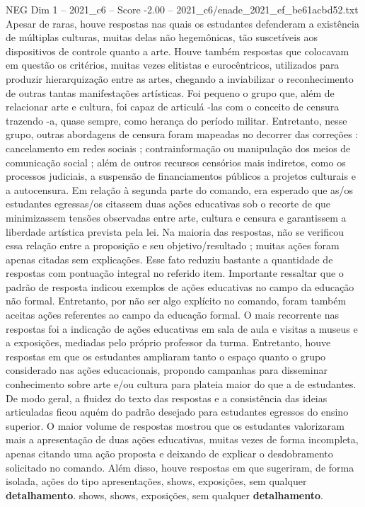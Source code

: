 \begin{textsample}{NEG Dim 1 – 2021\_c6 – Score -2.00 – 2021\_c6/enade\_2021\_ef\_be61acbd52.txt}
Apesar de raras, houve respostas nas quais os estudantes defenderam a existência de múltiplas culturas, muitas delas não hegemônicas, tão suscetíveis aos dispositivos de controle quanto a arte.
Houve também respostas que colocavam em questão os critérios, muitas vezes elitistas e eurocêntricos, utilizados para produzir hierarquização entre as artes, chegando a inviabilizar o reconhecimento de outras tantas manifestações artísticas.
Foi pequeno o grupo que, além de relacionar arte e cultura, foi capaz de articulá -las com o conceito de censura trazendo -a, quase sempre, como herança do período militar.
Entretanto, nesse grupo, outras abordagens de censura foram mapeadas no decorrer das correções : cancelamento em redes sociais ; contrainformação ou manipulação dos meios de comunicação social ; além de outros recursos censórios mais indiretos, como os processos judiciais, a suspensão de financiamentos públicos a projetos culturais e a autocensura.
Em relação à segunda parte do comando, era esperado que as/os estudantes egressas/os citassem duas ações educativas sob o recorte de que minimizassem tensões observadas entre arte, cultura e censura e garantissem a liberdade artística prevista pela lei.
Na maioria das respostas, não se verificou essa relação entre a proposição e seu objetivo/resultado ; muitas ações foram apenas citadas sem explicações.
Esse fato reduziu bastante a quantidade de respostas com pontuação integral no referido item.
Importante ressaltar que o padrão de resposta indicou exemplos de ações educativas no campo da educação não formal.
Entretanto, por não ser algo explícito no comando, foram também aceitas ações referentes ao campo da educação formal.
O mais recorrente nas respostas foi a indicação de ações educativas em sala de aula e visitas a museus e a exposições, mediadas pelo próprio professor da turma.
Entretanto, houve respostas em que os estudantes ampliaram tanto o espaço quanto o grupo considerado nas ações educacionais, propondo campanhas para disseminar conhecimento sobre arte e/ou cultura para plateia maior do que a de estudantes.
De modo geral, a fluidez do texto das respostas e a consistência das ideias articuladas ficou aquém do padrão desejado para estudantes egressos do ensino superior.
O maior volume de respostas mostrou que os estudantes valorizaram mais a apresentação de duas ações educativas, muitas vezes de forma incompleta, apenas citando uma ação proposta e deixando de explicar o desdobramento solicitado no comando.
Além disso, houve respostas em que sugeriram, de forma isolada, ações do tipo apresentações, shows, exposições, sem qualquer \textbf{detalhamento}. shows, shows, exposições, sem qualquer \textbf{detalhamento}.

\end{textsample}
